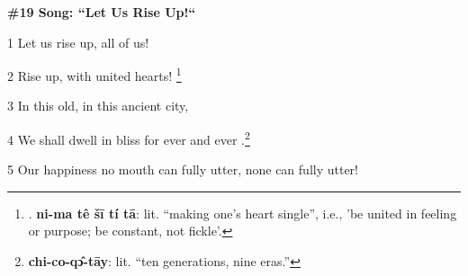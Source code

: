 
\textbf{\#19 Song: ``Let Us Rise Up!``}

1 Let us rise up, all of us!

2 Rise up,  with united hearts!  \footnote{. \textbf{ni-ma tê šī tí tā}: lit. ``making one's heart single'', i.e., 'be united in feeling or purpose; be constant, not fickle'.}

3 In this old, in this ancient city,

4 We shall dwell in bliss for ever and ever .\footnote{\textbf{ chi-co-qɔ̂-tāy}: lit. ``ten generations, nine eras.''}

5 Our happiness no mouth can fully utter, none can fully utter!

